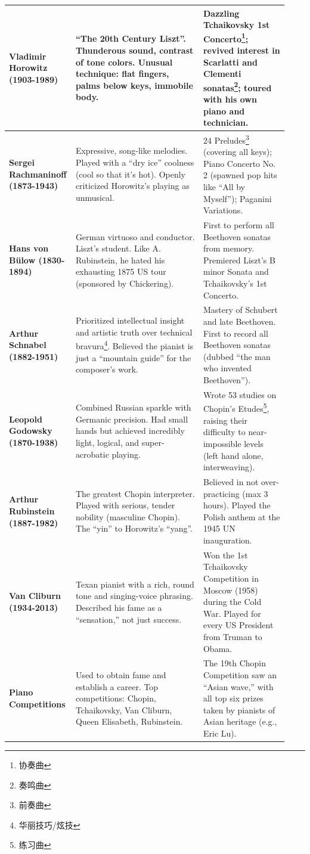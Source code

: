 \documentclass[math,code]{amznotes}
\theoremstyle{remark}
\begin{document}
\begin{longtable}{|p{0.18\linewidth}|p{0.45\linewidth}|p{0.3\linewidth}|}
\hline
\textbf{Vladimir Horowitz (1903-1989)} & ``The 20th Century Liszt''. Thunderous sound, contrast of tone colors. Unusual technique: flat fingers, palms below keys, immobile body. & Dazzling Tchaikovsky 1st Concerto\footnote{协奏曲}; revived interest in Scarlatti and Clementi sonatas\footnote{奏鸣曲}; toured with his own piano and technician. \\
\hline
\textbf{Sergei Rachmaninoff (1873-1943)} & Expressive, song-like melodies. Played with a ``dry ice'' coolness (cool so that it's hot). Openly criticized Horowitz's playing as unmusical. & 24 Preludes\footnote{前奏曲} (covering all keys); Piano Concerto No. 2 (spawned pop hits like ``All by Myself''); Paganini Variations. \\
\hline
\textbf{Hans von Bülow (1830-1894)} & German virtuoso and conductor. Liszt's student. Like A. Rubinstein, he hated his exhausting 1875 US tour (sponsored by Chickering). & First to perform all Beethoven sonatas from memory. Premiered Liszt's B minor Sonata and Tchaikovsky's 1st Concerto. \\
\hline
\textbf{Arthur Schnabel (1882-1951)} & Prioritized intellectual insight and artistic truth over technical bravura\footnote{华丽技巧/炫技}. Believed the pianist is just a ``mountain guide'' for the composer's work. & Mastery of Schubert and late Beethoven. First to record all Beethoven sonatas (dubbed ``the man who invented Beethoven''). \\
\hline
\textbf{Leopold Godowsky (1870-1938)} & Combined Russian sparkle with Germanic precision. Had small hands but achieved incredibly light, logical, and super-acrobatic playing. & Wrote 53 studies on Chopin's Etudes\footnote{练习曲}, raising their difficulty to near-impossible levels (left hand alone, interweaving). \\
\hline
\textbf{Arthur Rubinstein (1887-1982)} & The greatest Chopin interpreter. Played with serious, tender nobility (masculine Chopin). The ``yin'' to Horowitz's ``yang''. & Believed in not over-practicing (max 3 hours). Played the Polish anthem at the 1945 UN inauguration. \\
\hline
\textbf{Van Cliburn (1934-2013)} & Texan pianist with a rich, round tone and singing-voice phrasing. Described his fame as a ``sensation,'' not just success. & Won the 1st Tchaikovsky Competition in Moscow (1958) during the Cold War. Played for every US President from Truman to Obama. \\
\hline
\textbf{Piano Competitions} & Used to obtain fame and establish a career. Top competitions: Chopin, Tchaikovsky, Van Cliburn, Queen Elisabeth, Rubinstein. & The 19th Chopin Competition saw an ``Asian wave,'' with all top six prizes taken by pianists of Asian heritage (e.g., Eric Lu). \\

\end{longtable}
\end{document}

